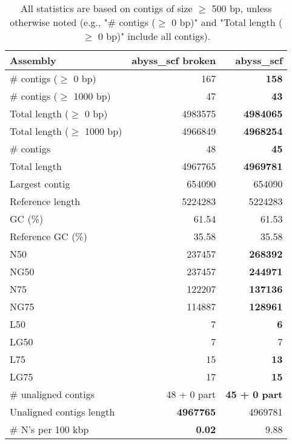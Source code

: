 \documentclass[12pt,a4paper]{article}
\begin{document}
\begin{table}[ht]
\begin{center}
\caption{All statistics are based on contigs of size $\geq$ 500 bp, unless otherwise noted (e.g., "\# contigs ($\geq$ 0 bp)" and "Total length ($\geq$ 0 bp)" include all contigs).}
\begin{tabular}{|l*{2}{|r}|}
\hline
Assembly & abyss\_scf broken & abyss\_scf \\ \hline
\# contigs ($\geq$ 0 bp) & 167 & {\bf 158} \\ \hline
\# contigs ($\geq$ 1000 bp) & 47 & {\bf 43} \\ \hline
Total length ($\geq$ 0 bp) & 4983575 & {\bf 4984065} \\ \hline
Total length ($\geq$ 1000 bp) & 4966849 & {\bf 4968254} \\ \hline
\# contigs & 48 & {\bf 45} \\ \hline
Total length & 4967765 & {\bf 4969781} \\ \hline
Largest contig & 654090 & 654090 \\ \hline
Reference length & 5224283 & 5224283 \\ \hline
GC (\%) & 61.54 & 61.53 \\ \hline
Reference GC (\%) & 35.58 & 35.58 \\ \hline
N50 & 237457 & {\bf 268392} \\ \hline
NG50 & 237457 & {\bf 244971} \\ \hline
N75 & 122207 & {\bf 137136} \\ \hline
NG75 & 114887 & {\bf 128961} \\ \hline
L50 & 7 & {\bf 6} \\ \hline
LG50 & 7 & 7 \\ \hline
L75 & 15 & {\bf 13} \\ \hline
LG75 & 17 & {\bf 15} \\ \hline
\# unaligned contigs & 48 + 0 part & {\bf 45 + 0 part} \\ \hline
Unaligned contigs length & {\bf 4967765} & 4969781 \\ \hline
\# N's per 100 kbp & {\bf 0.02} & 9.88 \\ \hline
\end{tabular}
\end{center}
\end{table}
\end{document}
